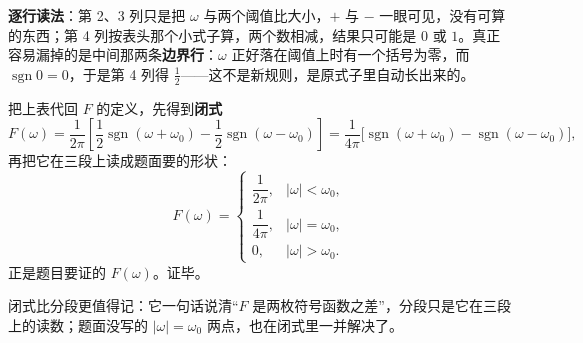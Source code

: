 \documentclass[11pt]{ctexart}
\begin{document}
\textbf{逐行读法}：第 2、3 列只是把 $\omega$ 与两个阈值比大小，$+$ 与 $-$ 一眼可见，没有可算的东西；第 4 列按表头那个小式子算，两个数相减，结果只可能是 $0$ 或 $1$。真正容易漏掉的是中间那两条\textbf{边界行}：$\omega$ 正好落在阈值上时有一个括号为零，而 $\operatorname{sgn}0=0$，于是第 4 列得 $\frac12$——这不是新规则，是原式子里自动长出来的。


把上表代回 $F$ 的定义，先得到\textbf{闭式}
\[
F(\omega)=\frac{1}{2\pi}\left[\frac12\operatorname{sgn}(\omega+\omega_0)-\frac12\operatorname{sgn}(\omega-\omega_0)\right]
=\frac{1}{4\pi}\Big[\operatorname{sgn}(\omega+\omega_0)-\operatorname{sgn}(\omega-\omega_0)\Big],
\]
再把它在三段上读成题面要的形状：
\[
F(\omega)=\begin{cases}
\dfrac{1}{2\pi}, & |\omega|<\omega_0,\\[4pt]
\dfrac{1}{4\pi}, & |\omega|=\omega_0,\\[4pt]
0, & |\omega|>\omega_0 .
\end{cases}
\]
正是题目要证的 $F(\omega)$。证毕。

闭式比分段更值得记：它一句话说清“$F$ 是两枚符号函数之差”，分段只是它在三段上的读数；题面没写的 $|\omega|=\omega_0$ 两点，也在闭式里一并解决了。

\end{document}
